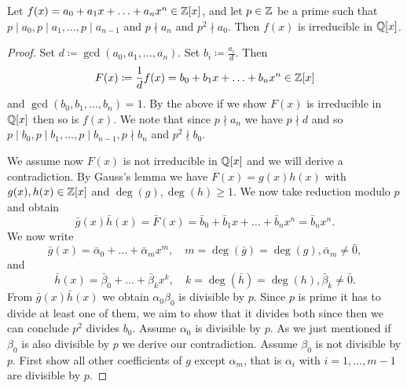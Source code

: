 \documentclass[10pt, a4paper]{article}
\begin{document}
\begin{proposition}
    Let $f(x) = a_0 + a_1x + \dotsc + a_nx ^ n \in \mathbb{Z}[x]$,
    and let $p \in \mathbb{Z}$ be a prime such that $p \mid a_0, p \mid a_1, \dotsc, p \mid a_{n - 1}$ and $p \nmid a_n$ and $p ^ 2 \nmid a_0$.
    Then $f(x)$ is irreducible in $\mathbb{Q}[x]$.

    \begin{proof}
        Set $d \coloneqq \gcd(a_0, a_1, \dotsc, a_n)$.
        Set $b_i \coloneqq \frac{a_i}{d}$.
        Then
        \[
        F(x) \coloneqq \frac{1}{d}f(x) = b_0 + b_1x + \dotsc + b_nx ^ n \in \mathbb{Z}[x]
        \]
        and $\gcd(b_0, b_1, \dotsc, b_n) = 1$.
        By the above if we show $F(x)$ is irreducible in $\mathbb{Q}[x]$ then so is $f(x)$.
        We note that since $p \nmid a_n$ we have $p \nmid d$ and so $p \mid b_0, p \mid b_1, \dotsc, p \mid b_{n - 1}, p \nmid b_n$ and $p ^ 2 \nmid b_0$.

        We assume now $F(x)$ is not irreducible in $\mathbb{Q}[x]$ and we will derive a contradiction.
        By Gauss's lemma we have $F(x) = g(x)h(x)$ with $g(x), h(x) \in \mathbb{Z}[x]$ and $\deg(g), \deg(h) \geq 1$.
        We now take reduction modulo $p$ and obtain
        \[
        \bar{g}(x)\bar{h}(x) = \bar{F}(x) = \bar{b}_0 + \bar{b}_1x + \dotsc + \bar{b}_nx ^ n = \bar{b}_nx ^ n.
        \]
        We now write
        \[
        \bar{g}(x) = \bar{\alpha}_0 + \dotsc + \bar{\alpha}_mx ^ m,\quad m = \deg(\bar{g}) = \deg(g), \bar{\alpha}_m \neq \bar{0},
        \]
        and
        \[
        \bar{h}(x) = \bar{\beta}_0 + \dotsc + \bar{\beta}_kx ^ k,\quad k = \deg(\bar{h}) = \deg(h), \bar{\beta}_k \neq \bar{0}.
        \]
        From $\bar{g}(x)\bar{h}(x)$ we obtain $\alpha_0\beta_0$ is divisible by $p$.
        Since $p$ is prime it has to divide at least one of them,
        we aim to show that it divides both since then we can conclude $p ^ 2$ divides $b_0$.
        Assume $\alpha_0$ is divisible by $p$.
        As we just mentioned if $\beta_0$ is also divisible by $p$ we derive our contradiction.
        Assume $\beta_0$ is not divisible by $p$.
        First show all other coefficients of $g$ except $\alpha_m$,
        that is $\alpha_i$ with $i = 1, \dotsc, m - 1$ are divisible by $p$.


\end{proof}
\end{proposition}
\end{document}
